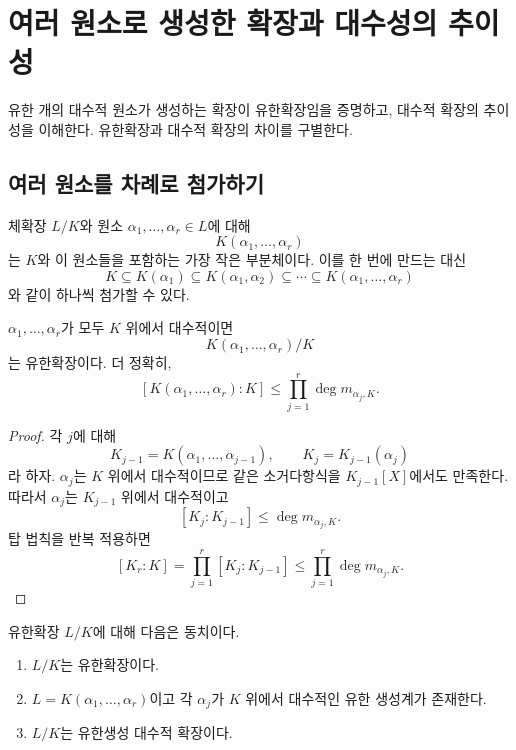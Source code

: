\section{여러 원소로 생성한 확장과 대수성의 추이성}
\label{sec:generated-algebraic-extensions}

\begin{learninggoal}
유한 개의 대수적 원소가 생성하는 확장이 유한확장임을 증명하고, 대수적 확장의 추이성을 이해한다. 유한확장과 대수적 확장의 차이를 구별한다.
\end{learninggoal}

\subsection{여러 원소를 차례로 첨가하기}

체확장 $L/K$와 원소 $\alpha_1,\dots,\alpha_r\in L$에 대해
\[
  K(\alpha_1,\dots,\alpha_r)
\]
는 $K$와 이 원소들을 포함하는 가장 작은 부분체이다. 이를 한 번에 만드는 대신
\[
  K\subseteq K(\alpha_1)\subseteq K(\alpha_1,\alpha_2)
  \subseteq\cdots\subseteq K(\alpha_1,\dots,\alpha_r)
\]
와 같이 하나씩 첨가할 수 있다.

\begin{theorem}
$\alpha_1,\dots,\alpha_r$가 모두 $K$ 위에서 대수적이면
\[
  K(\alpha_1,\dots,\alpha_r)/K
\]
는 유한확장이다. 더 정확히,
\[
  [K(\alpha_1,\dots,\alpha_r):K]
  \le\prod_{j=1}^r\deg m_{\alpha_j,K}.
\]
\end{theorem}

\begin{proof}
각 $j$에 대해
\[
  K_{j-1}=K(\alpha_1,\dots,\alpha_{j-1}),
  \qquad
  K_j=K_{j-1}(\alpha_j)
\]
라 하자. $\alpha_j$는 $K$ 위에서 대수적이므로 같은 소거다항식을 $K_{j-1}[X]$에서도 만족한다. 따라서 $\alpha_j$는 $K_{j-1}$ 위에서 대수적이고
\[
  [K_j:K_{j-1}]\le\deg m_{\alpha_j,K}.
\]
탑 법칙을 반복 적용하면
\[
  [K_r:K]
  =\prod_{j=1}^r[K_j:K_{j-1}]
  \le\prod_{j=1}^r\deg m_{\alpha_j,K}.
\]
\end{proof}

\begin{corollary}
유한확장 $L/K$에 대해 다음은 동치이다.
\begin{enumerate}[label=(\roman*)]
  \item $L/K$는 유한확장이다.
  \item $L=K(\alpha_1,\dots,\alpha_r)$이고 각 $\alpha_j$가 $K$ 위에서 대수적인 유한 생성계가 존재한다.
  \item $L/K$는 유한생성 대수적 확장이다.
\end{enumerate}
\end{corollary}

